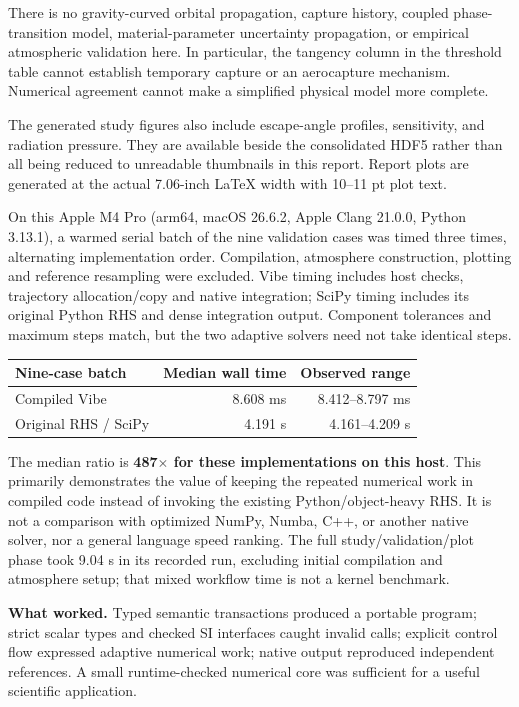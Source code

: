 \documentclass[10pt]{article}
\begin{document}
There is no gravity-curved orbital propagation, capture history, coupled
phase-transition model, material-parameter uncertainty propagation, or empirical
atmospheric validation here. In particular, the tangency column in the threshold
table cannot establish temporary capture or an aerocapture mechanism. Numerical
agreement cannot make a simplified physical model more complete.

The generated study figures also include escape-angle profiles, sensitivity,
and radiation pressure. They are available beside the consolidated HDF5 rather
than all being reduced to unreadable thumbnails in this report. Report plots
are generated at the actual 7.06-inch LaTeX width with 10--11 pt plot text.

\newpage
{}

On this Apple M4 Pro (arm64, macOS 26.6.2, Apple Clang 21.0.0, Python 3.13.1),
a warmed serial batch of the nine validation cases was timed three times,
alternating implementation order. Compilation, atmosphere construction,
plotting and reference resampling were excluded. Vibe timing includes host
checks, trajectory allocation/copy and native integration; SciPy timing includes
its original Python RHS and dense integration output. Component tolerances and
maximum steps match, but the two adaptive solvers need not take identical steps.

\begin{center}
\begin{tabular}{@{}lrr@{}}
\toprule
Nine-case batch & Median wall time & Observed range \\
\midrule
Compiled Vibe & 8.608 ms & 8.412--8.797 ms \\
Original RHS / SciPy & 4.191 s & 4.161--4.209 s \\
\bottomrule
\end{tabular}
\end{center}
The median ratio is \textbf{487$\times$ for these implementations on this host}.
This primarily demonstrates the value of keeping the repeated numerical work
in compiled code instead of invoking the existing Python/object-heavy RHS.
It is not a comparison with optimized NumPy, Numba, C++, or another native solver,
nor a general language speed ranking. The full study/validation/plot phase took
9.04 s in its recorded run, excluding initial compilation and atmosphere setup;
that mixed workflow time is not a kernel benchmark.

\textbf{What worked.} Typed semantic transactions produced a portable program;
strict scalar types and checked SI interfaces caught invalid calls; explicit
control flow expressed adaptive numerical work; native output reproduced
independent references. A small runtime-checked numerical core was sufficient
for a useful scientific application.
\end{document}
